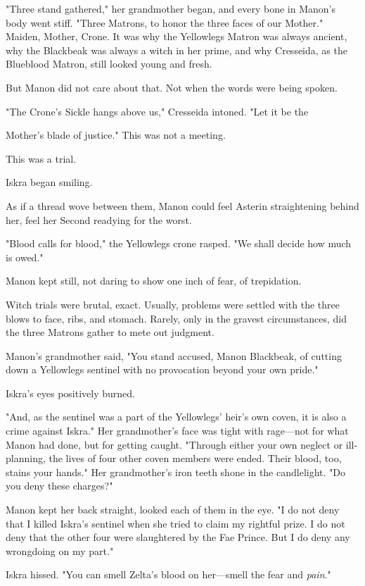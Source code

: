 "Three stand gathered," her grandmother began, and every bone in Manon's body went stiff. "Three Matrons, to honor the three faces of our Mother." Maiden, Mother, Crone. It was why the Yellowlegs Matron was always ancient, why the Blackbeak was always a witch in her prime, and why Cresseida, as the Blueblood Matron, still looked young and fresh.

But Manon did not care about that. Not when the words were being spoken.

"The Crone's Sickle hangs above us," Cresseida intoned. "Let it be the

Mother's blade of justice." This was not a meeting.

This was a trial.

Iskra began smiling.

As if a thread wove between them, Manon could feel Asterin straightening behind her, feel her Second readying for the worst.

"Blood calls for blood," the Yellowlegs crone rasped. "We shall decide how much is owed."

Manon kept still, not daring to show one inch of fear, of trepidation.

Witch trials were brutal, exact. Usually, problems were settled with the three blows to face, ribs, and stomach. Rarely, only in the gravest circumstances, did the three Matrons gather to mete out judgment.

Manon's grandmother said, "You stand accused, Manon Blackbeak, of cutting down a Yellowlegs sentinel with no provocation beyond your own pride."

Iskra's eyes positively burned.

"And, as the sentinel was a part of the Yellowlegs' heir's own coven, it is also a crime against Iskra." Her grandmother's face was tight with rage---not for what Manon had done, but for getting caught. "Through either your own neglect or ill-planning, the lives of four other coven members were ended. Their blood, too, stains your hands." Her grandmother's iron teeth shone in the candlelight. "Do you deny these charges?"

Manon kept her back straight, looked each of them in the eye. "I do not deny that I killed Iskra's sentinel when she tried to claim my rightful prize. I do not deny that the other four were slaughtered by the Fae Prince. But I do deny any wrongdoing on my part."

Iskra hissed. "You can smell Zelta's blood on her---smell the fear and
\emph{pain}."

